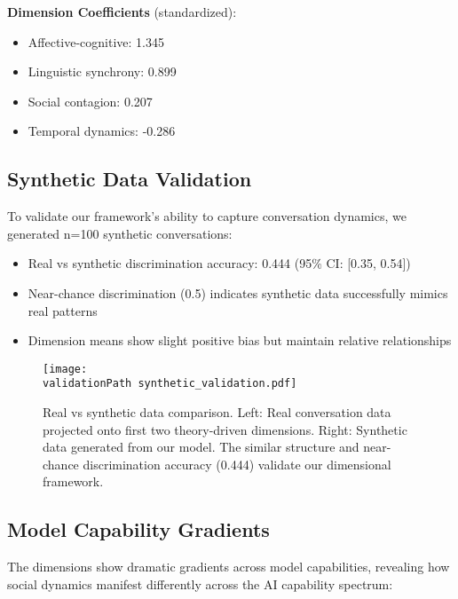 \documentclass[11pt,letterpaper]{article}
\newcommand{\socialContagionCoef}{0.207}
\newcommand{\affectiveCognitiveCoef}{1.345}
\newcommand{\linguisticSynchronyCoef}{0.899}
\newcommand{\temporalDynamicsCoef}{-0.286}
\newcommand{\syntheticDiscriminationAccuracy}{0.444}
\newcommand{\syntheticDiscriminationCI}{[0.35, 0.54]}
\newcommand{\validationPath}{../analysis/rigorous_analysis_outputs/validation/}
\begin{document}
\textbf{Dimension Coefficients} (standardized):
\begin{itemize}
    \item Affective-cognitive: \affectiveCognitiveCoef{}
    \item Linguistic synchrony: \linguisticSynchronyCoef{}
    \item Social contagion: \socialContagionCoef{}
    \item Temporal dynamics: \temporalDynamicsCoef{}
\end{itemize}

\subsection{Synthetic Data Validation}

To validate our framework's ability to capture conversation dynamics, we generated n=100 synthetic conversations:

\begin{itemize}
    \item Real vs synthetic discrimination accuracy: \syntheticDiscriminationAccuracy{} (95\% CI: \syntheticDiscriminationCI{})
    \item Near-chance discrimination (0.5) indicates synthetic data successfully mimics real patterns
    \item Dimension means show slight positive bias but maintain relative relationships
\end{itemize}

\begin{figure}[htbp]
\centering
\texttt{[image: \\validationPath synthetic\_validation.pdf]}
\caption{Real vs synthetic data comparison. Left: Real conversation data projected onto first two theory-driven dimensions. Right: Synthetic data generated from our model. The similar structure and near-chance discrimination accuracy (\syntheticDiscriminationAccuracy{}) validate our dimensional framework.}
\label{fig:synthetic_validation}
\end{figure}

\subsection{Model Capability Gradients}

The dimensions show dramatic gradients across model capabilities, revealing how social dynamics manifest differently across the AI capability spectrum:
\end{document}
